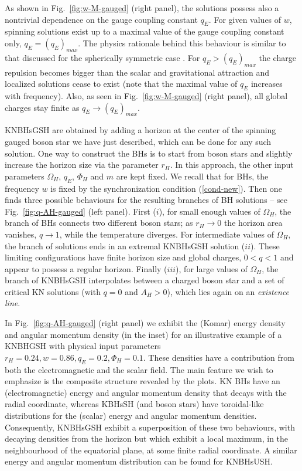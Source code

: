 \documentclass{article}
\begin{document}
As shown in Fig.~\ref{fig:w-M-gauged} (right panel), 
the solutions possess also a nontrivial dependence on 
the gauge coupling constant $q_E$.
For given values of $w$,
spinning solutions exist up to a maximal
value of the gauge coupling constant only, $q_E=(q_E)_{max}$.
The physics rationale behind this behaviour 
is similar to that discussed for the spherically symmetric case 
\cite{Jetzer:1989av,Pugliese:2013gsa}.
For $q_E>(q_E)_{max}$ the charge repulsion  becomes bigger than
  the scalar and gravitational attraction and localized solutions cease to exist  
(note that the maximal value of $q_E$
increases with frequency).
Also, as seen in Fig.~\ref{fig:w-M-gauged} (right panel),
all global charges stay finite as $q_E\to (q_E)_{max}$.
 

KNBHsGSH are obtained by adding a horizon at the center of the spinning gauged boson star  
we have just described, which can be done for  any such  solution.
One way to construct the BHs
  is to  start from  boson stars 
and slightly increase the horizon size via the parameter $r_H$.
In this approach, the other input parameters 
$\Omega_H$, $q_E$,  $\Phi_H$ and $m$
are kept fixed. 
We recall that for BHs, the frequency $w$ is fixed by the synchronization condition (\ref{cond-new}).
Then one finds three 
possible behaviours for
the resulting branches of BH solutions -- see Fig.~\ref{fig:q-AH-gauged} (left panel).
 First  ($i$), for small enough values of $\Omega_H$,
 the branch of BHs connects two different boson stars; 
as $r_H\to 0$ the horizon area vanishes, $q\to 1$, while the temperature
 diverges.
For intermediate values of  $\Omega_H$,
the branch of solutions ends in an extremal KNBHsGSH solution ($ii$). 
These limiting configurations have finite
horizon size   and global charges, $0<q<1$ and appear to possess 
a regular horizon.
Finally   ($iii$), for large values of $\Omega_H$,
the branch of  KNBHsGSH interpolates between 
a charged boson star and a set of critical KN solutions (with $q=0$ and $A_H>0$), which lies again 
on an {\it existence line}. 

 In Fig.~\ref{fig:q-AH-gauged} (right panel) we exhibit the (Komar) energy density and angular momentum density (in the inset) for an illustrative example of a KNBHGSH  with physical input parameters 
$r_H=0.24, w =0.86, q_E =0.2, \Phi_H=0.1$. 
These densities have a contribution from both the electromagnetic and the scalar field. The main feature we wish to emphasize is the composite structure revealed by the plots. KN BHs have an (electromagnetic) energy and angular momentum density that decays with the radial coordinate, whereas KBHsSH 
(and boson stars)
have toroidal-like distributions for the (scalar) energy and angular momentum densities. 
Consequently, KNBHsGSH exhibit a superposition of these two behaviours, with decaying densities from the horizon but which exhibit a local maximum, in the neighbourhood of the equatorial plane, at some finite radial coordinate. 
A similar energy and angular momentum distribution can be found for KNBHsUSH.  
\end{document}

